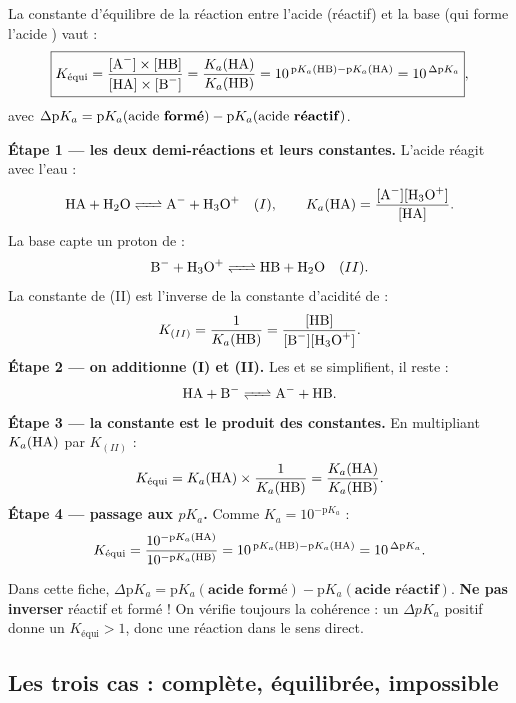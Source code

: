 \documentclass[11pt,a4paper]{article}
\begin{document}
\begin{theoreme}
La constante d'équilibre de la réaction entre l'acide  (réactif) et la base  (qui forme l'acide
) vaut :
\[ \boxed{K_{\text{équi}} = \frac{[\ce{A-}]\times[\ce{HB}]}{[\ce{HA}]\times[\ce{B-}]}
       = \frac{K_a(\ce{HA})}{K_a(\ce{HB})} = 10^{\,\mathrm{p}K_a(\ce{HB})-\mathrm{p}K_a(\ce{HA})}
       = 10^{\,\Delta\mathrm{p}K_a}}, \]
avec $\Delta\mathrm{p}K_a = \mathrm{p}K_a(\text{acide \textbf{formé}}) - \mathrm{p}K_a(\text{acide \textbf{réactif}})$.
\end{theoreme}

\begin{methode}
\textbf{Étape 1 — les deux demi-réactions et leurs constantes.} L'acide  réagit avec l'eau :
\[ \ce{HA + H2O <=> A- + H3O+} \quad (I), \qquad K_a(\ce{HA}) = \frac{[\ce{A-}][\ce{H3O+}]}{[\ce{HA}]}. \]
La base  capte un proton de  :
\[ \ce{B- + H3O+ <=> HB + H2O} \quad (II). \]
La constante de (II) est l'inverse de la constante d'acidité de  :
\[ K_{(II)} = \frac{1}{K_a(\ce{HB})} = \frac{[\ce{HB}]}{[\ce{B-}][\ce{H3O+}]}. \]
\textbf{Étape 2 — on additionne (I) et (II).} Les  et  se simplifient, il reste :
\[ \ce{HA + B- <=> A- + HB}. \]
\textbf{Étape 3 — la constante est le produit des constantes.} En multipliant $K_a(\ce{HA})$ par $K_{(II)}$ :
\[ K_{\text{équi}} = K_a(\ce{HA})\times\frac{1}{K_a(\ce{HB})} = \frac{K_a(\ce{HA})}{K_a(\ce{HB})}. \]
\textbf{Étape 4 — passage aux $pK_a$.} Comme $K_a = 10^{-\mathrm{p}K_a}$ :
\[ K_{\text{équi}} = \frac{10^{-\mathrm{p}K_a(\ce{HA})}}{10^{-\mathrm{p}K_a(\ce{HB})}}
   = 10^{\,\mathrm{p}K_a(\ce{HB})-\mathrm{p}K_a(\ce{HA})} = 10^{\,\Delta\mathrm{p}K_a}. \]
\end{methode}

\begin{attention}
Dans cette fiche, $\Delta\mathrm{p}K_a = \mathrm{p}K_a(\textbf{acide formé}) - \mathrm{p}K_a(\textbf{acide
réactif})$. \textbf{Ne pas inverser} réactif et formé ! On vérifie toujours la cohérence : un $\Delta pK_a$
positif donne un $K_{\text{équi}} > 1$, donc une réaction dans le sens direct.
\end{attention}

\subsection{Les trois cas : complète, équilibrée, impossible}
\end{document}
